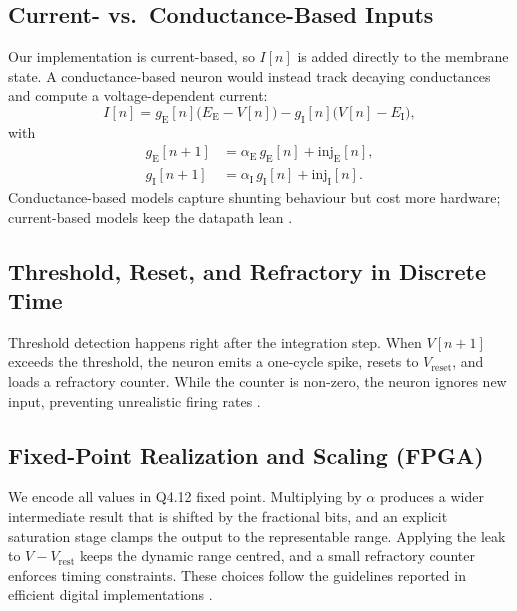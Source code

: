\documentclass[10pt,onecolumn]{IEEEtran}
\newcommand{\Vrest}{V_{\mathrm{rest}}}
\newcommand{\EE}{E_{\mathrm{E}}}
\newcommand{\EI}{E_{\mathrm{I}}}
\newcommand{\gE}{g_{\mathrm{E}}}
\newcommand{\gI}{g_{\mathrm{I}}}
\begin{document}
\subsection*{Current- vs.\ Conductance-Based Inputs}
Our implementation is current-based, so \(I[n]\) is added directly to the membrane state. A conductance-based neuron would instead track decaying conductances and compute a voltage-dependent current:
\begin{equation}
I[n] = \gE[n]\bigl(\EE - V[n]\bigr) - \gI[n]\bigl(V[n]-\EI\bigr),
\label{eq:cond_current}
\end{equation}
with
\begin{align}
\gE[n{+}1] &= \alpha_{\mathrm{E}}\,\gE[n] + \mathrm{inj}_{\mathrm{E}}[n],\\
\gI[n{+}1] &= \alpha_{\mathrm{I}}\,\gI[n] + \mathrm{inj}_{\mathrm{I}}[n].
\end{align}
Conductance-based models capture shunting behaviour but cost more hardware; current-based models keep the datapath lean \cite{GerstnerKistler2002,Izhikevich2003}.

\subsection*{Threshold, Reset, and Refractory in Discrete Time}
Threshold detection happens right after the integration step. When \(V[n{+}1]\) exceeds the threshold, the neuron emits a one-cycle spike, resets to \(V_{\mathrm{reset}}\), and loads a refractory counter. While the counter is non-zero, the neuron ignores new input, preventing unrealistic firing rates \cite{GerstnerKistler2002,Maass1997}.

\subsection*{Fixed-Point Realization and Scaling (FPGA)}
We encode all values in Q4.12 fixed point. Multiplying by \(\alpha\) produces a wider intermediate result that is shifted by the fractional bits, and an explicit saturation stage clamps the output to the representable range. Applying the leak to \(V-\Vrest\) keeps the dynamic range centred, and a small refractory counter enforces timing constraints. These choices follow the guidelines reported in efficient digital implementations \cite{IndiveriLiu2015,Furber2014,Merolla2014,Davies2018}.
\end{document}
